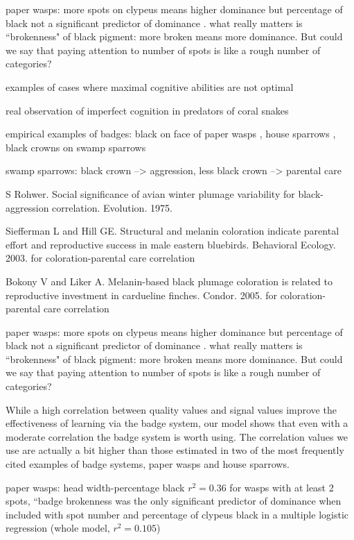 paper wasps: more spots on clypeus means higher dominance \cite{Tibbetts:2004kx} but percentage of black not a significant predictor of dominance \cite{Tibbetts:2004kx}. what really matters is ``brokenness" of black pigment: more broken means more dominance. But could we say that paying attention to number of spots is like a rough number of categories? 





examples of cases where maximal cognitive abilities are not optimal
\cite{Kerr:2003vn,Stephens:1991fk,Brush:2016kx,Dunlap:2009vn} 

real observation of imperfect cognition in predators of coral snakes \cite{Kikuchi:2010ys}

empirical examples of badges: black on face of paper wasps \cite{Tibbetts:2004kx}, house sparrows \cite{Veiga:1993fk}, black crowns on swamp sparrows \cite{Olsen:2010uq}

 swamp sparrows: black crown --> aggression, less black crown --> parental care 
 
 S Rohwer. Social significance of avian winter plumage variability for black-aggression correlation. Evolution. 1975.
 
 Siefferman L and Hill GE. Structural and melanin coloration indicate parental effort and reproductive success in male eastern bluebirds. Behavioral Ecology. 2003. for coloration-parental care correlation
 
 Bokony V and Liker A. Melanin-based black plumage coloration is related to reproductive investment in cardueline finches. Condor. 2005. for coloration-parental care correlation
 
paper wasps: more spots on clypeus means higher dominance \cite{Tibbetts:2004kx} but percentage of black not a significant predictor of dominance \cite{Tibbetts:2004kx}. what really matters is ``brokenness" of black pigment: more broken means more dominance. But could we say that paying attention to number of spots is like a rough number of categories? 

While a high correlation between quality values and signal values improve the effectiveness of learning via the badge system, our model shows that even with a moderate correlation the badge system is worth using. The correlation values we use are actually a bit higher than those estimated in two of the most frequently cited examples of badge systems, paper wasps and house sparrows.

paper wasps: head width-percentage black $r^2=0.36$ for wasps with at least 2 spots, ``badge brokenness was the only significant predictor of dominance when included with spot number and percentage of clypeus black in a multiple logistic regression (whole model, $r^2=0.105$)  \cite{Tibbetts:2004kx} 

